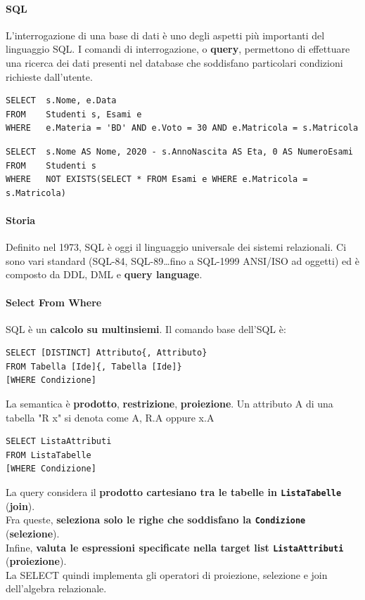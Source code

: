 \documentclass[10pt]{book}
\begin{document}
\paragraph{SQL} L'interrogazione di una base di dati è uno degli aspetti più importanti del linguaggio SQL. I comandi di interrogazione, o \textbf{query}, permettono di effettuare una ricerca dei dati presenti nel database che soddisfano particolari condizioni richieste dall'utente.
\begin{lstlisting}
SELECT	s.Nome, e.Data
FROM	Studenti s, Esami e
WHERE	e.Materia = 'BD' AND e.Voto = 30 AND e.Matricola = s.Matricola
\end{lstlisting}
\begin{lstlisting}
SELECT	s.Nome AS Nome, 2020 - s.AnnoNascita AS Eta, 0 AS NumeroEsami
FROM	Studenti s
WHERE	NOT EXISTS(SELECT * FROM Esami e WHERE e.Matricola = s.Matricola)
\end{lstlisting}
\paragraph{Storia} Definito nel 1973, SQL è oggi il linguaggio universale dei sistemi relazionali. Ci sono vari standard (SQL-84, SQL-89\ldots fino a SQL-1999 ANSI/ISO ad oggetti) ed è composto da DDL, DML e \textbf{query language}.
\paragraph{Select From Where} SQL è un \textbf{calcolo su multinsiemi}. Il comando base dell'SQL è:
\begin{lstlisting}
SELECT [DISTINCT] Attributo{, Attributo}
FROM Tabella [Ide]{, Tabella [Ide]}
[WHERE Condizione]
\end{lstlisting}
La semantica è \textbf{prodotto}, \textbf{restrizione}, \textbf{proiezione}. Un attributo A di una tabella "R x" si denota come A, R.A oppure x.A

\begin{lstlisting}
SELECT ListaAttributi
FROM ListaTabelle
[WHERE Condizione]
\end{lstlisting}
La query considera il \textbf{prodotto cartesiano tra le tabelle in \texttt{ListaTabelle}} (\textbf{join}).\\
Fra queste, \textbf{seleziona solo le righe che soddisfano la \texttt{Condizione}} (\textbf{selezione}).\\
Infine, \textbf{valuta le espressioni specificate nella target list \texttt{ListaAttributi}} (\textbf{proiezione}).\\
La SELECT quindi implementa gli operatori di proiezione, selezione e join dell'algebra relazionale.
\end{document}
